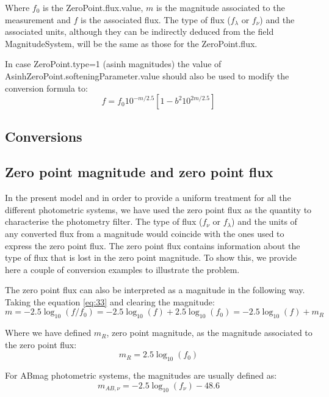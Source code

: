 \documentclass[11pt,a4paper]{ivoa}
\begin{document}
Where $f_0$ is the ZeroPoint.flux.value, $m$ is the magnitude associated to the
measurement and $f$ is the associated flux. The type of flux ($f_\lambda $ or $f_\nu $)
and the associated units, although they can be indirectly deduced from the field
MagnitudeSystem, will be the same as those for the ZeroPoint.flux.
\par
In case ZeroPoint.type=1 (asinh magnitudes) the value of
AsinhZeroPoint.softeningParameter.value should also be used to modify the conversion
formula to:
\begin{equation} \label{eq:34}
f = f_0 10^{-m/2.5}\left[ 1 - b^2 10^{2m/2.5}\right]
\end{equation}

\begin{appendices}
\section{Conversions}
\subsection{Zero point magnitude and zero point flux} \label{a.1conversion}
In the present model and in order to provide a uniform treatment for all the
different photometric systems, we have used the zero point flux as the quantity
to characterise the photometry filter. The type of flux ($f_\nu $ or $f_\lambda$)
and the units of any converted flux from a magnitude would coincide with the ones
used to express the zero point flux. The zero point flux contains information
about the type of flux that is lost in the zero point magnitude. To show this, we
provide here a couple of conversion examples to illustrate the problem.
\par
The zero point flux can also be interpreted as a magnitude in the following way.
Taking the equation \ref{eq:33} and clearing the magnitude:
\begin{equation} \label{eq:35}
m=-2.5\log_{10}(f/f_0 )=-2.5\log_{10}(f)+2.5\log_{10}(f_0 )=-2.5\log_{10} (f)+m_R
\end{equation}

Where we have defined $m_R$, zero point magnitude, as the magnitude associated to
the zero point flux:
\begin{equation} \label{eq:36}
m_R = 2.5\log_{10} (f_0 )
\end{equation}

For ABmag photometric systems, the magnitudes are usually defined as:
\begin{equation} \label{eq:37}
m_{AB,\nu } = -2.5\log_{10} (f_\nu ) - 48.6
\end{equation}


\end{appendices}
\end{document}
